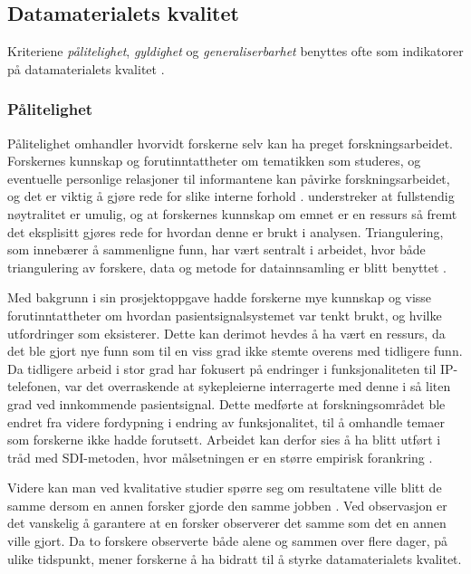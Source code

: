 \subsection{Datamaterialets kvalitet}
Kriteriene \textit{pålitelighet}, \textit{gyldighet} og \textit{generaliserbarhet} benyttes ofte som indikatorer på datamaterialets kvalitet \citep{Tjora}.

\subsubsection{Pålitelighet}
Pålitelighet omhandler hvorvidt forskerne selv kan ha preget forskningsarbeidet. Forskernes kunnskap og forutinntattheter om tematikken som studeres, og eventuelle personlige relasjoner til informantene kan påvirke forskningsarbeidet, og det er viktig å gjøre rede for slike interne forhold \citep{Tjora}. \citet{Tjora} understreker at fullstendig nøytralitet er umulig, og at forskernes kunnskap om emnet er en ressurs så fremt det eksplisitt gjøres rede for hvordan denne er brukt i analysen. Triangulering, som innebærer å sammenligne funn, har vært sentralt i arbeidet, hvor både triangulering av forskere, data og metode for datainnsamling er blitt benyttet \citep{Oates}. 

\noindent
Med bakgrunn i sin prosjektoppgave hadde forskerne mye kunnskap og visse forutinntattheter om hvordan pasientsignalsystemet var tenkt brukt, og hvilke utfordringer som eksisterer. Dette kan derimot hevdes å ha vært en ressurs, da det ble gjort nye funn som til en viss grad ikke stemte overens med tidligere funn. Da tidligere arbeid i stor grad har fokusert på endringer i funksjonaliteten til IP-telefonen, var det overraskende at sykepleierne interragerte med denne i så liten grad ved innkommende pasientsignal. Dette medførte at forskningsområdet ble endret fra videre fordypning i endring av funksjonalitet, til å omhandle temaer som forskerne ikke hadde forutsett. Arbeidet kan derfor sies å ha blitt utført i tråd med SDI-metoden, hvor målsetningen er en større empirisk forankring \citep{Tjora}.

\noindent
Videre kan man ved kvalitative studier spørre seg om resultatene ville blitt de samme dersom en annen forsker gjorde den samme jobben \citep{Tjora}. Ved observasjon er det  vanskelig å garantere at en forsker observerer det samme som det en annen ville gjort. Da to forskere observerte både alene og sammen over flere dager, på ulike tidspunkt, mener forskerne å ha bidratt til å styrke datamaterialets kvalitet. 


